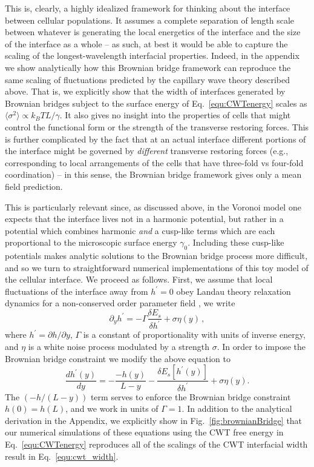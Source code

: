 \documentclass[twoside,twocolumn,9pt]{article}
\begin{document}
This is, clearly, a highly idealized framework for thinking about the interface between cellular populations.
It assumes a complete separation of length scale between whatever is generating the local energetics of the interface and the size of the interface as a whole -- as such, at best it would be able to capture the scaling of the longest-wavelength interfacial properties.
Indeed, in the appendix we show analytically how this Brownian bridge framework can reproduce the same scaling of fluctuations predicted by the capillary wave theory described above.
That is, we explicitly show that the width of interfaces generated by Brownian bridges subject to the surface energy of Eq.~\ref{equ:CWTenergy} scales as $\langle\sigma^{2}\rangle\propto {k_{B}T}L/\gamma$.
It also gives no insight into the properties of cells that might control the functional form or the strength of the transverse restoring forces.
This is further complicated by the fact that at an actual interface different portions of the interface might be governed by \emph{different} transverse restoring forces (e.g., corresponding to local arrangements of the cells that have three-fold vs four-fold coordination) -- in this sense, the Brownian bridge framework gives only a mean field prediction.

This is particularly relevant since, as discussed above, in the Voronoi model one expects that the interface lives not in a harmonic potential, but rather in a potential which combines harmonic \emph{and} a cusp-like terms which are each proportional to the microscopic surface energy $\gamma_0$.
Including these cusp-like potentials makes analytic solutions to the Brownian bridge process more difficult, and so we turn to straightforward numerical implementations of this toy model of the cellular interface. We proceed as follows. First, we assume that local fluctuations of the interface away from $h^{\prime}=0$ obey Landau theory relaxation dynamics for a non-conserved order parameter field \cite{goldenfeld2018lectures}, we write
\begin{equation}
    \label{eq::defn_LandauRelaxationDynamics}
    \partial_{y}h^{\prime} = -\Gamma\frac{\delta{E_s}}{\delta{h}^{\prime}}+ \sigma\eta(y)\,,
\end{equation}
where $h^{\prime}=\partial{h}/\partial{y}$, $\Gamma$ is a constant of proportionality with units of inverse energy, and $\eta$ is a white noise process modulated by a strength $\sigma$. In order to impose the Brownian bridge constraint we modify the above equation to \cite{ross1995stochastic}
\begin{equation}
    \label{eq::defn_LandauRelaxationDynamics_numeric}
    \frac{dh^{\prime}(y)}{dy} = -\frac{-h(y)}{L-y} - \frac{\delta{E_s}[h^{\prime}(y)]}{\delta{h}^{\prime}} + \sigma\eta(y).
\end{equation}
The  $(-h/(L-y))$ term serves to enforce the Brownian bridge constraint $h(0)=h(L)$, and we work in units of $\Gamma=1$. In addition to the analytical derivation in the Appendix, we explicitly show in Fig.~\ref{fig:brownianBridge} that our numerical simulations of these equations using the CWT free energy in Eq.~\ref{equ:CWTenergy} reproduces all of the scalings of the CWT interfacial width result in Eq.~\ref{equ:cwt_width}. 
\end{document}
